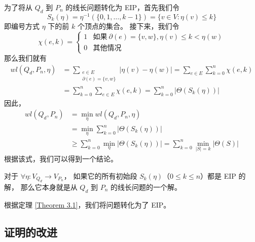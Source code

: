 为了将从 $Q_d$ 到 $P_n$ 的线长问题转化为 EIP，首先我们令
\begin{equation*}
S_k(\eta) = \eta^{-1}(\{0, 1, \dots, k - 1\}) = \{v \in V \colon \eta(v) \le k\}
\end{equation*}
即编号方式 $\eta$ 下的前 $k$ 个顶点的集合。
接下来，我们令
\begin{equation*}
\chi(e, k) = \begin{cases}
	1 & \text{如果}\ \partial(e) = \{v, w\}, \eta(v) \le k < \eta(w) \\
	0 & \text{其他情况}
\end{cases}
\end{equation*}
那么我们就有
\begin{align*}
wl(Q_d, P_n, \eta) & = \sum_{\substack{
			       e \in E \\
			       \partial(e) = \{v, w\}
		       }} |\eta(v) - \eta(w)|
		     = \sum_{e \in E} \sum_{k = 0}^n \chi(e, k) \\
		   & = \sum_{k = 0}^n \sum_{e \in E} \chi(e, k)
		     = \sum_{k = 0}^n |\Theta(S_k(\eta))|
\end{align*}
因此，
\begin{align*}
wl(Q_d, P_n) & = \min_{\eta} wl(Q_d, P_n, \eta) \\
	     & = \min_{\eta} \sum_{k = 0}^n |\Theta(S_k(\eta))| \\
	     & \ge \sum_{k = 0}^n \min_{\eta} |\Theta(S_k(\eta))|
	       = \sum_{k = 0}^n \min_{|S| = k} |\Theta(S)|
\end{align*}
根据该式，我们可以得到一个结论。

\begin{theorem}
\label{Theorem 3.1}
对于 $\forall \eta \colon V_{Q_d} \rightarrow V_{P_n}$，
如果它的所有初始段 $S_k(\eta)$（$0 \le k \le n$）都是 EIP 的解，
那么它本身就是从 $Q_d$ 到 $P_n$ 的线长问题的一个解。
\end{theorem}

根据定理 \ref{Theorem 3.1}，我们将问题转化为了 EIP。

\subsection{证明的改进}
\label{Subsection 3.1.3}
